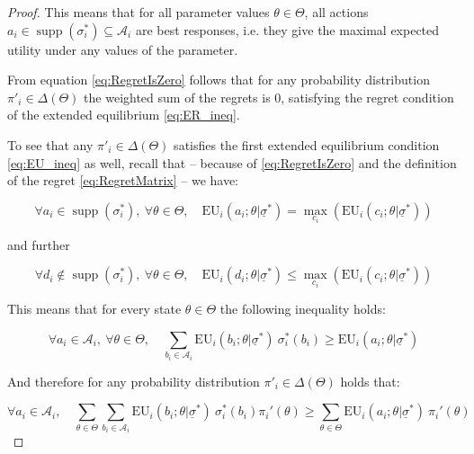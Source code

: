 \documentclass{article}
\theoremstyle{definition}
\DeclareMathOperator\supp{supp}
\begin{document}
\begin{proof}
    This means that for all parameter values $\theta \in \Theta$, all actions $a_i \in \supp(\sigma_i^*) \subseteq \mathcal{A}_i$ are best responses, i.e. they give the maximal expected utility under any values of the parameter.

    From equation \eqref{eq:RegretIsZero} follows that for any probability distribution $\pi'_i \in \Delta(\Theta)$ the weighted sum of the regrets is $0$, satisfying the regret condition of the extended equilibrium \eqref{eq:ER_ineq}. 

    To see that any $\pi'_i \in \Delta(\Theta)$ satisfies the first extended equilibrium condition \eqref{eq:EU_ineq} as well, recall that -- because of \eqref{eq:RegretIsZero} and the definition of the regret \eqref{eq:RegretMatrix} -- we have:

    \begin{equation}
        \forall a_i \in \supp(\sigma_i^*), \ \forall \theta \in \Theta, \quad
        \mathrm{EU}_i(a_i;\theta|\underline{\sigma}^*) = 
        \max_{c_i} \left ( \mathrm{EU}_i(c_i;\theta|\underline{\sigma}^*) \right )
    \end{equation}

    and further

    \begin{equation}
        \forall d_i \notin \supp(\sigma_i^*), \ \forall \theta \in \Theta, \quad
        \mathrm{EU}_i(d_i;\theta|\underline{\sigma}^*) \le 
        \max_{c_i} \left ( \mathrm{EU}_i(c_i;\theta|\underline{\sigma}^*) \right )
    \end{equation}

    This means that for every state $\theta \in \Theta$ the following inequality holds:

    \begin{equation}
        \forall a_i \in \mathcal{A}_i, \ \forall \theta \in \Theta, \quad
        \sum_{b_i \in \mathcal{A}_i} \mathrm{EU}_i(b_i;\theta|\underline{\sigma}^*) \ \sigma_i^*(b_i)
        \ge 
        \mathrm{EU}_i(a_i;\theta|\underline{\sigma}^*)
    \end{equation}

    And therefore for any probability distribution $\pi'_i \in \Delta(\Theta)$ holds that:

    \begin{equation}
        \forall a_i \in \mathcal{A}_i, \quad
        \sum_{\theta \in \Theta} \sum_{b_i \in \mathcal{A}_i} \mathrm{EU}_i(b_i;\theta|\underline{\sigma}^*) \ \sigma_i^*(b_i) \pi_i'(\theta)
        \ge 
        \sum_{\theta \in \Theta}  \mathrm{EU}_i(a_i;\theta|\underline{\sigma}^*) \ \pi_i'(\theta)
    \end{equation}


\end{proof}
\end{document}
